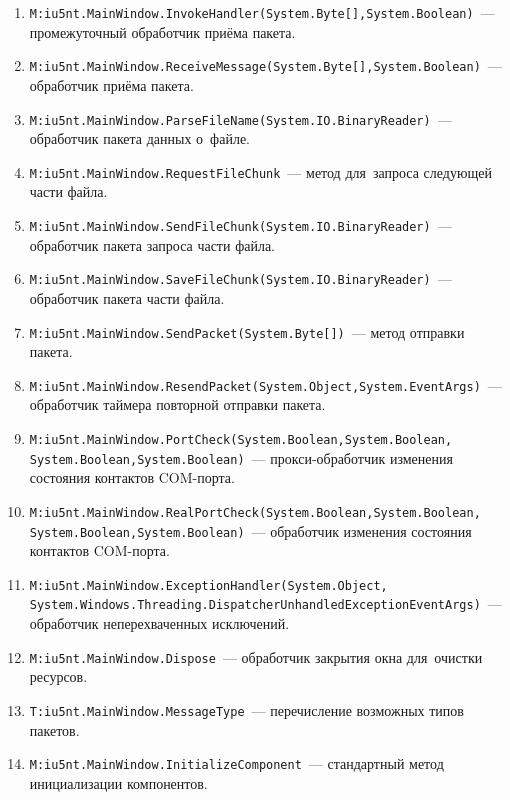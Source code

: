 \documentclass[a4paper,12pt]{article}
\begin{document}
\begin{enumerate}[noitemsep]
\item \texttt{M:iu5nt.MainWindow.InvokeHandler(System.Byte[],System.Boolean)}~--- промежуточный обработчик приёма пакета.
\item \texttt{M:iu5nt.MainWindow.ReceiveMessage(System.Byte[],System.Boolean)}~--- обработчик приёма пакета.
\item \texttt{M:iu5nt.MainWindow.ParseFileName(System.IO.BinaryReader)}~--- обработчик пакета данных о~файле.
\item \texttt{M:iu5nt.MainWindow.RequestFileChunk}~--- метод для~запроса следующей части файла.
\item \texttt{M:iu5nt.MainWindow.SendFileChunk(System.IO.BinaryReader)}~--- обработчик пакета запроса части файла.
\item \texttt{M:iu5nt.MainWindow.SaveFileChunk(System.IO.BinaryReader)}~--- обработчик пакета части файла.
\item \texttt{M:iu5nt.MainWindow.SendPacket(System.Byte[])}~--- метод отправки пакета.
\item \texttt{M:iu5nt.MainWindow.ResendPacket(System.Object,System.EventArgs)}~--- обработчик таймера повторной отправки пакета.
\item \texttt{M:iu5nt.MainWindow.PortCheck(System.Boolean,System.Boolean,\\System.Boolean,System.Boolean)}~--- прокси-обработчик изменения состояния контактов COM-порта.
\item \texttt{M:iu5nt.MainWindow.RealPortCheck(System.Boolean,System.Boolean,\\System.Boolean,System.Boolean)}~--- обработчик изменения состояния контактов COM-порта.
\item \texttt{M:iu5nt.MainWindow.ExceptionHandler(System.Object,\\System.Windows.Threading.DispatcherUnhandledExceptionEventArgs)}~--- обработчик неперехваченных исключений.
\item \texttt{M:iu5nt.MainWindow.Dispose}~--- обработчик закрытия окна для~очистки ресурсов.
\item \texttt{T:iu5nt.MainWindow.MessageType}~--- перечисление возможных типов пакетов.
\item \texttt{M:iu5nt.MainWindow.InitializeComponent}~--- стандартный метод инициализации компонентов.
\end{enumerate}
\end{document}
